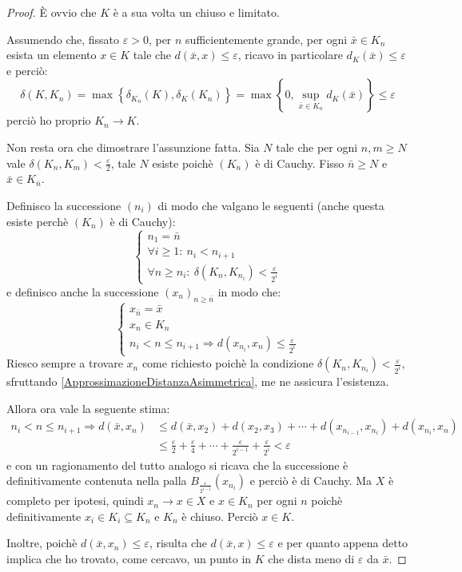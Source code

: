 \begin{proof}
	È ovvio che $K$ è a sua volta un chiuso e limitato.
	
	Assumendo che, fissato $\varepsilon>0$, per $n$ sufficientemente grande, per ogni $\bar{x}\in K_n$ esista un elemento $x\in K$ tale che $d(\bar{x},x)\le \varepsilon$, ricavo in particolare $d_K(\bar{x})\le \varepsilon$ e perciò: 
	\begin{equation*}
		\delta(K,K_n)=\max\left\{\delta_{K_n}(K),\delta_K(K_n)\right\}=\max\left\{0,{}\sup_{\bar{x}\in K_n} d_K(\bar x)\right\}\le \varepsilon
	\end{equation*}
	perciò ho proprio $K_n\to K$.
	
	Non resta ora che dimostrare l'assunzione fatta. Sia $N$ tale che per ogni $n,m\ge N$ vale $\delta(K_n,K_m) < \frac{\varepsilon}2$, tale $N$ esiste poichè $(K_n)$ è di Cauchy. Fisso $\bar{n}\ge N$ e $\bar x\in K_{\bar n}$.
	
	Definisco la successione $(n_i)$ di modo che valgano le seguenti (anche questa esiste perchè $(K_n)$ è di Cauchy):
	\begin{equation*}
	\begin{cases}
		n_1=\bar n\\
		\forall i\ge 1:\ n_i<n_{i+1} \\
		\forall n\ge n_i:\ \delta(K_n,K_{n_i}) < \frac{\varepsilon}{2^i}
	\end{cases}\end{equation*}
	e definisco anche la successione $(x_n)_{n\ge \bar n}$ in modo che:
	\begin{equation*}\begin{cases}
		x_{\bar n}=\bar x\\
		x_n\in K_n\\
		n_i<n\le n_{i+1}\Longrightarrow d(x_{n_i},x_n)\le \frac{\varepsilon}{2^i}
	\end{cases}\end{equation*}
	Riesco sempre a trovare $x_n$ come richiesto poichè la condizione $\delta(K_n,K_{n_i}) < \frac{\varepsilon}{2^i}$, sfruttando \cref{ApprossimazioneDistanzaAsimmetrica}, me ne assicura l'esistenza.
	
	Allora ora vale la seguente stima:
	\begin{align*}
		n_i<n\le n_{i+1}\Longrightarrow d(\bar x, x_n)&\le d(\bar x, x_2)+d(x_2,x_3)+\cdots+d(x_{n_{i-1}},x_{n_i})+
		d(x_{n_i},x_n)\\
		&\le\frac{\varepsilon}2+\frac{\varepsilon}4+\cdots+\frac{\varepsilon}{2^{i-1}}
		+\frac{\varepsilon}{2^i}<\varepsilon
	\end{align*}
	e con un ragionamento del tutto analogo si ricava che la successione è definitivamente contenuta nella palla $B_{\frac{\varepsilon}{2^{i-1}}}(x_{n_i})$ e perciò è di Cauchy. 
	Ma $X$ è completo per ipotesi, quindi $x_n\to x\in X$ e $x\in K_n$ per ogni $n$ poichè definitivamente $x_i\in K_i \subseteq K_n$ e $K_n$ è chiuso. Perciò $x\in K$.
	
	Inoltre, poichè $d(\bar x,x_n)\le \varepsilon$, risulta che $d(\bar x, x)\le \varepsilon$ e per quanto appena detto implica che ho trovato, come cercavo, un punto in $K$ che dista meno di $\varepsilon$ da $\bar x$.
	
\end{proof}

